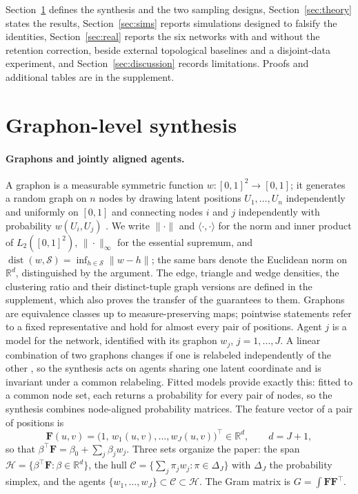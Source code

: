 \documentclass[12pt]{article}
\newcommand{\R}{\mathbb{R}}
\newcommand{\calH}{\mathcal{H}}
\newcommand{\calC}{\mathcal{C}}
\newcommand{\dist}{\operatorname{dist}}
\newcommand{\supn}[1]{\|#1\|_{\infty}}
\newcommand{\norm}[1]{\|#1\|}
\newcommand{\Fv}{\mathbf{F}}
\begin{document}
Section~\ref{sec:setup} defines the synthesis and the two sampling designs, Section~\ref{sec:theory} states the results, Section~\ref{sec:sims} reports simulations designed to falsify the identities, Section~\ref{sec:real} reports the six networks with and without the retention correction, beside external topological baselines and a disjoint-data experiment, and Section~\ref{sec:discussion} records limitations. Proofs and additional tables are in the supplement.

\section{Graphon-level synthesis}
\label{sec:setup}

\paragraph{Graphons and jointly aligned agents.}
A graphon is a measurable symmetric function $w:[0,1]^2\to[0,1]$; it generates a random graph on $n$ nodes by drawing latent positions $U_1,\dots,U_n$ independently and uniformly on $[0,1]$ and connecting nodes $i$ and $j$ independently with probability $w(U_i,U_j)$ \citep{Aldous1985, Hoover1979, LovaszSzegedy2006}. We write $\norm{\cdot}$ and $\langle\cdot,\cdot\rangle$ for the norm and inner product of $L_2([0,1]^2)$, $\supn{\cdot}$ for the essential supremum, and $\dist(w,\mathcal{S})=\inf_{h\in\mathcal{S}}\norm{w-h}$; the same bars denote the Euclidean norm on $\R^d$, distinguished by the argument. The edge, triangle and wedge densities, the clustering ratio and their distinct-tuple graph versions are defined in the supplement, which also proves the transfer of the guarantees to them. Graphons are equivalence classes up to measure-preserving maps; pointwise statements refer to a fixed representative and hold for almost every pair of positions. Agent $j$ is a model for the network, identified with its graphon $w_j$, $j=1,\dots,J$. A linear combination of two graphons changes if one is relabeled independently of the other \citep{KloppTsybakovVerzelen2017}, so the synthesis acts on agents sharing one latent coordinate and is invariant under a common relabeling. Fitted models provide exactly this: fitted to a common node set, each returns a probability for every pair of nodes, so the synthesis combines node-aligned probability matrices. The feature vector of a pair of positions is
\[
\Fv(u,v)=\big(1,\,w_1(u,v),\dots,w_J(u,v)\big)^{\top}\in\R^{d},\qquad d=J+1,
\]
so that $\beta^{\top}\Fv=\beta_0+\sum_{j}\beta_j w_j$. Three sets organize the paper: the span $\calH=\{\beta^{\top}\Fv:\beta\in\R^{d}\}$, the hull $\calC=\{\sum_j\pi_j w_j:\pi\in\Delta_J\}$ with $\Delta_J$ the probability simplex, and the agents $\{w_1,\dots,w_J\}\subset\calC\subset\calH$. The Gram matrix is $G=\int\Fv\Fv^{\top}$.
\end{document}
